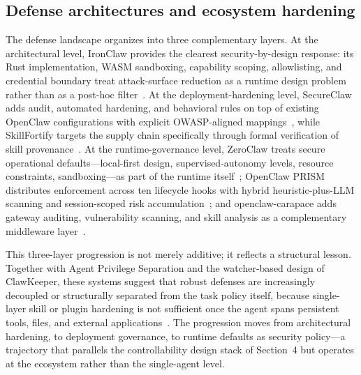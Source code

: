 \subsection{Defense architectures and ecosystem hardening}

The defense landscape organizes into three complementary layers. At the architectural level, IronClaw provides the clearest security-by-design response: its Rust implementation, WASM sandboxing, capability scoping, allowlisting, and credential boundary treat attack-surface reduction as a runtime design problem rather than as a post-hoc filter~\cite{ironclaw2026}. At the deployment-hardening level, SecureClaw adds audit, automated hardening, and behavioral rules on top of existing OpenClaw configurations with explicit OWASP-aligned mappings~\cite{secureclaw2026}, while SkillFortify targets the supply chain specifically through formal verification of skill provenance~\cite{skillfortify2026}. At the runtime-governance level, ZeroClaw treats secure operational defaults---local-first design, supervised-autonomy levels, resource constraints, sandboxing---as part of the runtime itself~\cite{zeroclaw2026}; OpenClaw PRISM distributes enforcement across ten lifecycle hooks with hybrid heuristic-plus-LLM scanning and session-scoped risk accumulation~\cite{openclawprism2026}; and openclaw-carapace adds gateway auditing, vulnerability scanning, and skill analysis as a complementary middleware layer~\cite{openclawcarapace2026}.

This three-layer progression is not merely additive; it reflects a structural lesson. Together with Agent Privilege Separation and the watcher-based design of ClawKeeper, these systems suggest that robust defenses are increasingly decoupled or structurally separated from the task policy itself, because single-layer skill or plugin hardening is not sufficient once the agent spans persistent tools, files, and external applications~\cite{agentprivsep2026,clawkeeper2026}. The progression moves from architectural hardening, to deployment governance, to runtime defaults as security policy---a trajectory that parallels the controllability design stack of Section~4 but operates at the ecosystem rather than the single-agent level.

